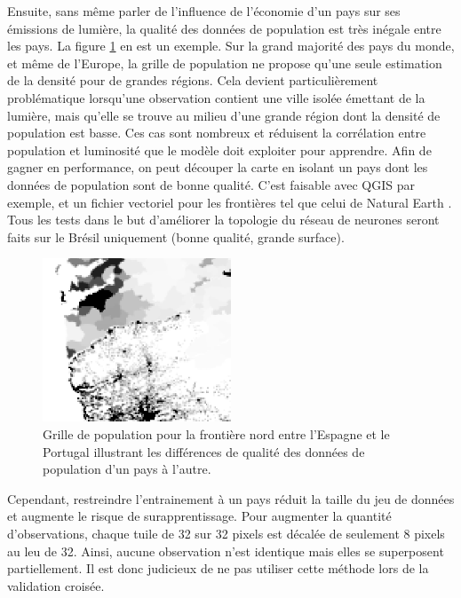 \documentclass[a4paper, 11pt]{report}
\begin{document}
Ensuite, sans même parler de l'influence de l'économie d'un pays sur ses émissions de lumière, la qualité des données de population est très inégale entre les pays. La figure \ref{spain-portugal} en est un exemple. Sur la grand majorité des pays du monde, et même de l'Europe, la grille de population ne propose qu'une seule estimation de la densité pour de grandes régions. Cela devient particulièrement problématique lorsqu'une observation contient une ville isolée émettant de la lumière, mais qu'elle se trouve au milieu d'une grande région dont la densité de population est basse. Ces cas sont nombreux et réduisent la corrélation entre population et luminosité que le modèle doit exploiter pour apprendre. Afin de gagner en performance, on peut découper la carte en isolant un pays dont les données de population sont de bonne qualité. C'est faisable avec QGIS par exemple, et un fichier vectoriel pour les frontières tel que celui de Natural Earth \cite{naturalearthdata}. Tous les tests dans le but d'améliorer la topologie du réseau de neurones seront faits sur le Brésil uniquement (bonne qualité, grande surface).

\begin{figure}
	\centering
	\includegraphics[width=0.5\textwidth]{img/spain-portugal.png}
	\caption{Grille de population pour la frontière nord entre l'Espagne et le Portugal illustrant les différences de qualité des données de population d'un pays à l'autre.}
	\label{spain-portugal}
\end{figure}

Cependant, restreindre l'entrainement à un pays réduit la taille du jeu de données et augmente le risque de surapprentissage. Pour augmenter la quantité d'observations, chaque tuile de 32 sur 32 pixels est décalée de seulement 8 pixels au leu de 32. Ainsi, aucune observation n'est identique mais elles se superposent partiellement. Il est donc judicieux de ne pas utiliser cette méthode lors de la validation croisée.
\end{document}
